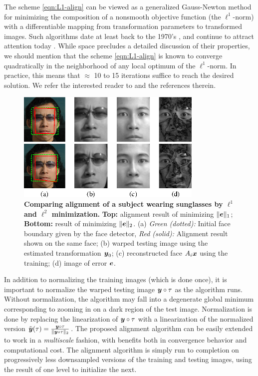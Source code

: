 \documentclass[10pt,journal,letterpaper,compsoc]{IEEEtran}
\begin{document}
The scheme \eqref{eqn:L1-align} can be viewed as a generalized Gauss-Newton method for minimizing the composition of a nonsmooth objective function (the $\ell^1$-norm) with a differentiable mapping from transformation parameters to transformed images. Such algorithms date at least back to the 1970's  \cite{Cromme1978-NM,Jittorntrum1980-NM}, and continue to attract attention today \cite{Lewis2008-TR}. While space precludes a detailed discussion of their properties, we should mention that the scheme \eqref{eqn:L1-align} is known to converge quadratically in the neighborhood of any local optimum of the $\ell^1$-norm. In practice, this means that $\approx$ 10 to 15 iterations suffice to reach the desired solution. We refer the interested reader to \cite{Jittorntrum1980-NM,Osborne1990-JAMSSB} and the references therein.

\begin{figure}
\centering
\includegraphics[width=3.5in]{Figure_2}
\caption{{\bf Comparing alignment of a subject wearing sunglasses by
$\ell^1$ and $\ell^2$ minimization.}
{\bf Top:} alignment result of minimizing $\|\boldsymbol{e}\|_1$; {\bf Bottom:}
result of minimizing $\|\boldsymbol{e}\|_2$. (a) {\em Green (dotted):} Initial face boundary
given by the face detector, {\em Red (solid):} Alignment result shown on the same
face; (b) warped testing image using the estimated transformation ${\boldsymbol{y}}_0$;
(c) reconstructed face $A_i{\boldsymbol{x}}$ using the training; (d) image of error $\boldsymbol{e}$. }\label{fig:L1-L2-align}
\vspace{-5.0mm}
\end{figure}

In addition to normalizing the training images (which is done
once), it is important to normalize the warped testing image
${\boldsymbol{y}} \circ \tau$ as the algorithm runs.  Without normalization,
the algorithm may fall into a degenerate global minimum
corresponding to zooming in on a dark region of the test
image.  Normalization is done by replacing the linearization of
${\boldsymbol{y}} \circ \tau$ with a linearization of the normalized version
$\tilde {{\boldsymbol{y}}}(\tau) = \frac{{\boldsymbol{y}} \circ \tau}{\|{\boldsymbol{y}} \circ \tau\|_2}$.
The proposed alignment algorithm can be easily extended to work
in a {\em multiscale} fashion, with benefits both in
convergence behavior and computational cost.  The alignment
algorithm is simply run to completion on progressively less
downsampled versions of the training and testing images, using
the result of one level to initialize the next.
\end{document}
